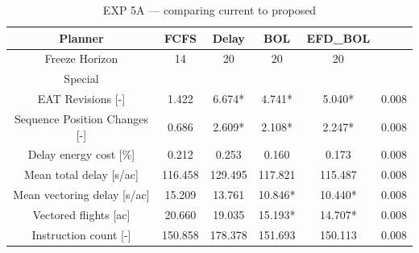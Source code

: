 \begin{table}[htbp]
\caption{EXP 5A — comparing current to proposed}
\begin{center}
\footnotesize
\setlength{\tabcolsep}{3pt}
\renewcommand{\arraystretch}{1.000}
\begin{tabular}{|c|c|c|c|c|c|}
\hline
Planner & FCFS & Delay & BOL & EFD\_BOL &  \\
\hline
Freeze Horizon & 14 & 20 & 20 & 20 &  \\
\hline
Special &  &  &  &  &  \\
\hline
EAT Revisions [-] & 1.422 & 6.674* & 4.741* & 5.040* & 0.008 \\
\hline
Sequence Position Changes [-] & 0.686 & 2.609* & 2.108* & 2.247* & 0.008 \\
\hline
Delay energy cost [\%] & 0.212 & 0.253 & 0.160 & 0.173 & 0.008 \\
\hline
Mean total delay [s/ac] & 116.458 & 129.495 & 117.821 & 115.487 & 0.008 \\
\hline
Mean vectoring delay [s/ac] & 15.209 & 13.761 & 10.846* & 10.440* & 0.008 \\
\hline
Vectored flights [ac] & 20.660 & 19.035 & 15.193* & 14.707* & 0.008 \\
\hline
Instruction count [-] & 150.858 & 178.378 & 151.693 & 150.113 & 0.008 \\
\hline
\end{tabular}
\label{tab:exp\_5a\_comparing\_current\_to\_proposed}
\end{center}
\end{table}